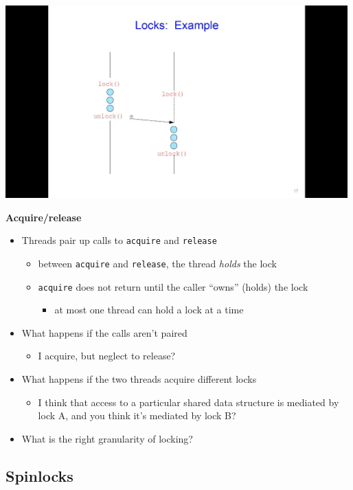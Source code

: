 \documentclass[11pt,a4paper]{article}
\begin{document}
\includegraphics[height=280]{locks.jpg}

\textbf{Acquire/release}
\begin{itemize}
    \item Threads pair up calls to \texttt{acquire} and \texttt{release}
        \begin{itemize}
            \item between \texttt{acquire} and \texttt{release}, the thread \emph{holds}
                the lock
            \item \texttt{acquire} does not return until the caller ``owns'' (holds) the lock
                \begin{itemize}
                    \item at most one thread can hold a lock at a time
                \end{itemize}
        \end{itemize}
    \item What happens if the calls aren't paired
        \begin{itemize}
            \item I acquire, but neglect to release?
        \end{itemize}
    \item What happens if the two threads acquire different locks
        \begin{itemize}
            \item I think that access to a particular shared data structure is
                mediated by lock A, and you think it's mediated by lock B?\
        \end{itemize}
    \item What is the right granularity of locking?
\end{itemize}

\subsection{Spinlocks}
\end{document}
